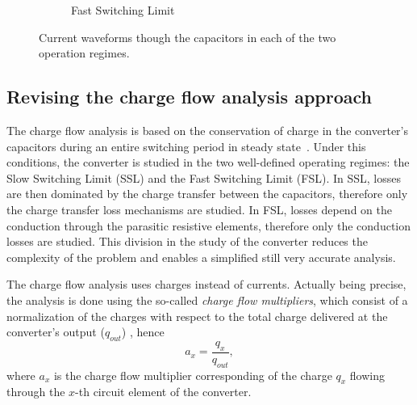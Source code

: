 \begin{figure}[!h]
\begin{subfigure}[t]{.45\textwidth}
    \caption{Fast Switching Limit}
    \label{fig:ic_fsl}
\end{subfigure}
\caption[Current waveforms in the converter's capacitors]{Current waveforms though the capacitors in each of the two operation regimes. }
\label{fig:capacitor_current}
\end{figure}


\subsection{Revising the charge flow analysis approach}
The charge flow analysis is based on the conservation of charge in the converter's capacitors during an entire switching period in steady state~\cite{95Makowski}. Under this conditions, the converter is studied in the two well-defined operating regimes: the Slow Switching Limit (SSL) and the Fast Switching Limit (FSL). In SSL, losses are then dominated by the charge transfer between the capacitors, therefore only the charge transfer loss mechanisms are studied.  In FSL, losses depend on the conduction through the parasitic resistive elements, therefore only the conduction losses are studied. This division in the study of the converter reduces the complexity of the problem and enables a simplified still very accurate analysis.

The charge flow analysis uses charges instead of currents. Actually being precise, the analysis is done using the so-called \emph{charge flow multipliers}, which consist of a normalization of the charges with respect to the total charge delivered at the converter's output ($q_{out}$) , hence
$$
a_x  = \frac{q_x}{q_{out}},
$$
where $a_x$ is the charge flow multiplier corresponding of the charge $q_x$ flowing through the $x$-th circuit element of the converter.

